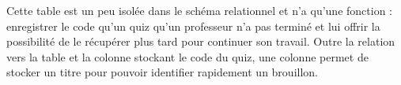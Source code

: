 \documentclass[a4paper,11pt,openany,oneside]{sphinxmanual}
\begin{document}

\begin{fulllineitems}
\label{database:quiz.models.QuizDraft}
Cette table est un peu isolée dans le schéma relationnel et n'a qu'une fonction :
enregistrer le code qu'un quiz qu'un professeur n'a pas terminé et lui offrir
la possibilité de le récupérer plus tard pour continuer son travail.
Outre la relation vers la table  et la colonne stockant le code du
quiz, une colonne permet de stocker un titre pour pouvoir identifier rapidement
un brouillon.

\end{fulllineitems}

\end{document}
